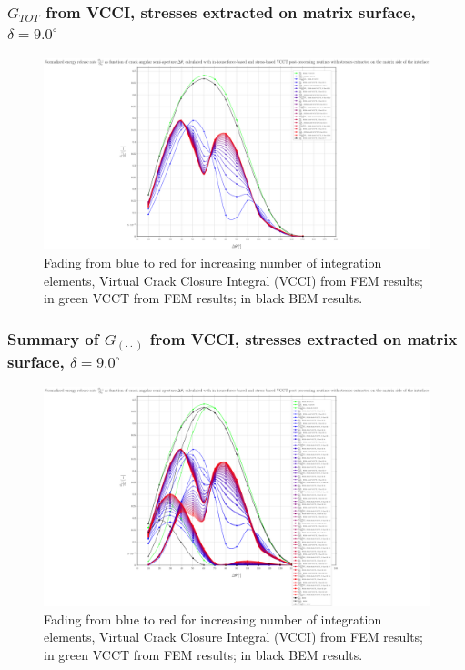 \begin{frame}
\frametitle{\small $G_{TOT}$ from VCCI, stresses extracted on matrix surface, $\delta=9.0^{\circ}$}
\vspace{-0.75cm}
\centering
\captionsetup[figure]{font=scriptsize,labelfont=scriptsize}
\begin{figure}[!h]
\centering
\includegraphics[height=0.7\textheight]{2017-07-25_AbqRunSummary_SmallStrain_D09/pdf/2017-07-25_AbqRunSummary_SmallStrain_D09_F-SoM-VCCT_GTOT.pdf}
  \caption{\scriptsize Fading from blue to red for increasing number of integration elements, Virtual Crack Closure Integral (VCCI) from FEM results; in green VCCT from FEM results; in black BEM results.}
  \label{fig:res1}
\end{figure}
\end{frame}
\begin{frame}
\frametitle{\small Summary of $G_{\left(\cdot\cdot\right)}$ from VCCI, stresses extracted on matrix surface, $\delta=9.0^{\circ}$}
\vspace{-0.75cm}
\centering
\captionsetup[figure]{font=scriptsize,labelfont=scriptsize}
\begin{figure}[!h]
\centering
\includegraphics[height=0.7\textheight]{2017-07-25_AbqRunSummary_SmallStrain_D09/pdf/2017-07-25_AbqRunSummary_SmallStrain_D09_F-SoM-VCCT_Summary.pdf}
  \caption{\scriptsize Fading from blue to red for increasing number of integration elements, Virtual Crack Closure Integral (VCCI) from FEM results; in green VCCT from FEM results; in black BEM results.}
  \label{fig:res1}
\end{figure}
\end{frame}
